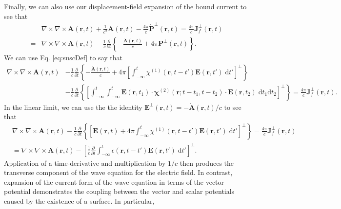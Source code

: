 \documentclass{article}
\begin{document}
Finally, we can also use our displacement-field expansion of the bound current to see that
\begin{equation}
\begin{split}
&\nabla\times\nabla\times\mathbf{A}(\mathbf{r},t) + \frac{1}{c^2}\ddot{\mathbf{A}}(\mathbf{r},t) - \frac{4\pi}{c}\dot{\mathbf{P}}^\perp(\mathbf{r},t) = \frac{4\pi}{c}\mathbf{J}^\perp_f(\mathbf{r},t)\\
= &\nabla\times\nabla\times\mathbf{A}(\mathbf{r},t) - \frac{1}{c}\frac{\partial}{\partial t}\left\{-\frac{\dot{\mathbf{A}}(\mathbf{r},t)}{c} + 4\pi\mathbf{P}^\perp(\mathbf{r},t)\right\}.
\end{split}
\end{equation}
We can use Eq. \eqref{eq:suscDef} to say that
\begin{equation}
\begin{split}
\nabla\times\nabla\times\mathbf{A}(\mathbf{r},t) &- \frac{1}{c}\frac{\partial}{\partial t}\left\{-\frac{\dot{\mathbf{A}}(\mathbf{r},t)}{c} + 4\pi\left[\int_{-\infty}^t\chi^{(1)}(\mathbf{r},t - t')\mathbf{E}(\mathbf{r},t')\;\mathrm{d}t'\right]^\perp\right\}\\
& - \frac{1}{c}\frac{\partial}{\partial t}\left\{\left[\int_{-\infty}^t\int_{-\infty}^t\mathbf{E}(\mathbf{r},t_1)\cdot\bm{\chi}^{(2)}(\mathbf{r};t - t_1,t - t_2)\cdot\mathbf{E}(\mathbf{r},t_2)\;\mathrm{d}t_1\mathrm{d}t_2\right]^\perp\right\} = \frac{4\pi}{c}\mathbf{J}^\perp_f(\mathbf{r},t).
\end{split}
\end{equation}
In the linear limit, we can use the the identity $\mathbf{E}^\perp(\mathbf{r},t) = -\dot{\mathbf{A}}(\mathbf{r},t)/c$ to see that
\begin{equation}
\begin{split}
&\nabla\times\nabla\times\mathbf{A}(\mathbf{r},t) - \frac{1}{c}\frac{\partial}{\partial t}\left\{\left[\mathbf{E}(\mathbf{r},t) + 4\pi\int_{-\infty}^t\chi^{(1)}(\mathbf{r},t - t')\mathbf{E}(\mathbf{r},t')\;\mathrm{d}t'\right]^\perp\right\} = \frac{4\pi}{c}\mathbf{J}^\perp_f(\mathbf{r},t)\\
&= \nabla\times\nabla\times\mathbf{A}(\mathbf{r},t) - \left[\frac{1}{c}\frac{\partial}{\partial t}\int_{-\infty}^t\epsilon(\mathbf{r},t - t')\mathbf{E}(\mathbf{r},t')\;\mathrm{d}t'\right]^\perp.
\end{split}
\end{equation}
Application of a time-derivative and multiplication by $1/c$ then produces the transverse component of the wave equation for the electric field. In contrast, expansion of the current form of the wave equation in terms of the vector potential demonstrates the coupling between the vector and scalar potentials caused by the existence of a surface. In particular,
\end{document}
